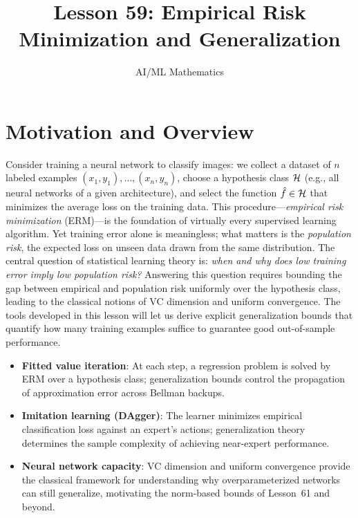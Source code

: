 \documentclass[11pt,a4paper]{article}
\title{Lesson 59: Empirical Risk Minimization and Generalization}
\author{AI/ML Mathematics}
\date{}
\begin{document}
\maketitle
\tableofcontents
\newpage


\section{Motivation and Overview}
\label{sec:motivation}

Consider training a neural network to classify images: we collect a dataset
of $n$ labeled examples $(x_1, y_1), \ldots, (x_n, y_n)$, choose a
hypothesis class $\mathcal{H}$ (e.g., all neural networks of a given
architecture), and select the function $\hat{f} \in \mathcal{H}$ that minimizes
the average loss on the training data.  This procedure---\emph{empirical
risk minimization} (ERM)---is the foundation of virtually every supervised
learning algorithm.  Yet training error alone is meaningless; what matters
is the \emph{population risk}, the expected loss on unseen data drawn from
the same distribution.  The central question of statistical learning theory
is: \emph{when and why does low training error imply low population risk?}
Answering this question requires bounding the gap between empirical and
population risk uniformly over the hypothesis class, leading to the
classical notions of VC dimension and uniform convergence.  The tools
developed in this lesson will let us derive explicit generalization bounds
that quantify how many training examples suffice to guarantee good
out-of-sample performance.

\begin{rlconnection}[title={Why ERM and Generalization Matter for RL/ML}]
\begin{itemize}[nosep]
    \item \textbf{Fitted value iteration}: At each step, a regression
    problem is solved by ERM over a hypothesis class; generalization bounds
    control the propagation of approximation error across Bellman backups.
    \item \textbf{Imitation learning (DAgger)}: The learner minimizes
    empirical classification loss against an expert's actions;
    generalization theory determines the sample complexity of achieving
    near-expert performance.
    \item \textbf{Neural network capacity}: VC dimension and uniform
    convergence provide the classical framework for understanding why
    overparameterized networks can still generalize, motivating the
    norm-based bounds of Lesson~61 and beyond.
\end{itemize}
\end{rlconnection}
\end{document}
